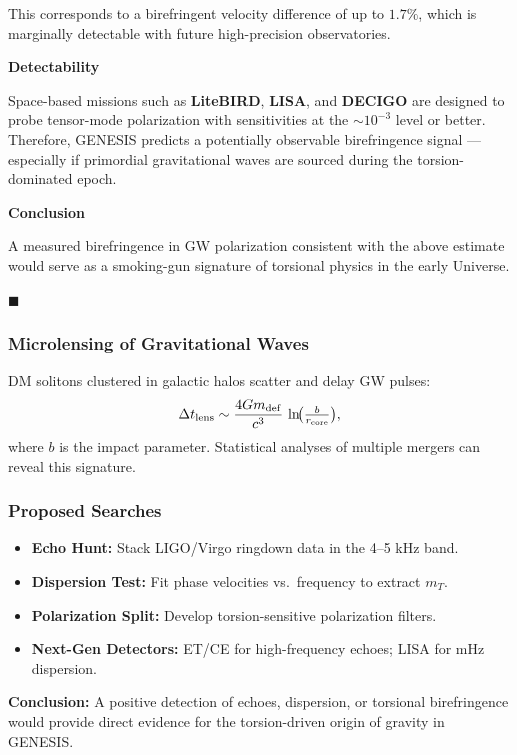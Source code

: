 \documentclass{article}
\begin{document}
This corresponds to a birefringent velocity difference of up to $1.7\%$, which is marginally detectable with future high-precision observatories.

\noindent \textbf{Detectability}

Space-based missions such as \textbf{LiteBIRD}, \textbf{LISA}, and \textbf{DECIGO} are designed to probe tensor-mode polarization with sensitivities at the $\sim 10^{-3}$ level or better. Therefore, GENESIS predicts a potentially observable birefringence signal --- especially if primordial gravitational waves are sourced during the torsion-dominated epoch.

\noindent \textbf{Conclusion}

A measured birefringence in GW polarization consistent with the above estimate would serve as a smoking-gun signature of torsional physics in the early Universe.

\hfill $\blacksquare$



\subsubsection{ Microlensing of Gravitational Waves}
DM solitons clustered in galactic halos scatter and delay GW pulses:
\begin{equation}\label{eq:auto177}
\Delta t_{\rm lens} \sim \frac{4Gm_{\rm def}}{c^3}\,\ln\!\bigl(\tfrac{b}{r_{\rm core}}\bigr),
\end{equation}
where \(b\) is the impact parameter.  Statistical analyses of multiple mergers
can reveal this signature.

\subsubsection{Proposed Searches}
\begin{itemize}
  \item \textbf{Echo Hunt:} Stack LIGO/Virgo ringdown data in the 4–5 kHz band.
  \item \textbf{Dispersion Test:} Fit phase velocities vs.\ frequency to extract \(m_T\).
  \item \textbf{Polarization Split:} Develop torsion-sensitive polarization filters.
  \item \textbf{Next-Gen Detectors:} ET/CE for high-frequency echoes; LISA for mHz dispersion.
\end{itemize}

\noindent\textbf{Conclusion:}  
A positive detection of echoes, dispersion, or torsional birefringence would
provide direct evidence for the torsion-driven origin of gravity in GENESIS.
\end{document}
